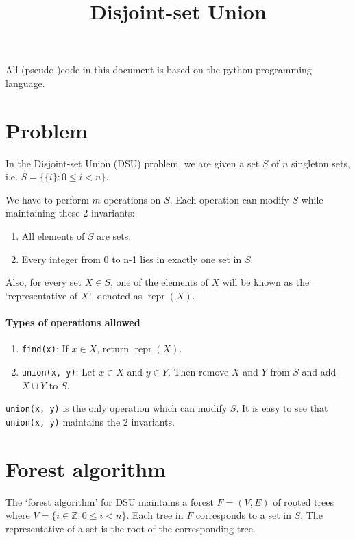 

\usepackage{listings}

\lstset{language=Python}

\title{Disjoint-set Union}



\initAfterBeginDocument{}

All (pseudo-)code in this document is based on the python programming language.

\section{Problem}

In the Disjoint-set Union (DSU) problem, we are given a set $S$ of $n$ singleton sets,
i.e. $S = \{\{i\}: 0 \le i < n\}$.

We have to perform $m$ operations on $S$.
Each operation can modify $S$ while maintaining these 2 invariants:
\begin{enumerate}
\item All elements of $S$ are sets.
\item Every integer from 0 to n-1 lies in exactly one set in $S$.
\end{enumerate}

Also, for every set $X \in S$, one of the elements of $X$ will be known as the `representative of $X$',
denoted as $\operatorname{repr}(X)$.

\paragraph*{Types of operations allowed}
\begin{enumerate}
\item \texttt{find(x)}: If $x \in X$, return $\operatorname{repr}(X)$.
\item \texttt{union(x, y)}: Let $x \in X$ and $y \in Y$.
Then remove $X$ and $Y$ from $S$ and add $X \cup Y$ to $S$.
\end{enumerate}

\texttt{union(x, y)} is the only operation which can modify $S$.
It is easy to see that \texttt{union(x, y)} maintains the 2 invariants.

\section{Forest algorithm}

The `forest algorithm' for DSU maintains a forest $F = (V, E)$ of rooted trees
where $V = \{i \in \mathbb{Z}: 0 \le i < n\}$.
Each tree in $F$ corresponds to a set in $S$.
The representative of a set is the root of the corresponding tree.

